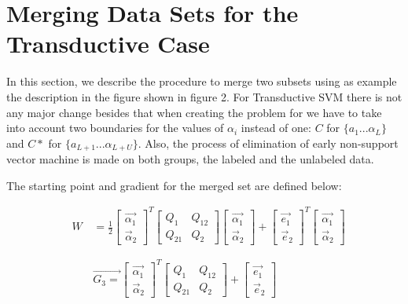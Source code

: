 \section{Merging Data Sets for the Transductive Case}

In this section, we describe the procedure to merge two subsets
using as example the description in the figure shown in figure 2.
For Transductive SVM there is not any major change besides that
when creating the problem for  we have
to take into account two boundaries for the values of $\alpha_{i}$
instead of one: $C$ for $\{a_{1}...\alpha_{L}\}$and $C*$ for $\{a_{L+1}...\alpha_{L+U}\}$.
Also, the process of elimination of early non-support vector machine
 is made on both groups, the labeled and the unlabeled data. 

The starting point and gradient for the merged set are defined below:

\begin{eqnarray}
 & W\, & =\frac{1}{2}\left[\begin{array}{c}
\vec{\alpha_{1}}\\
\vec{\alpha}_{2}\end{array}\right]^{T}\left[\begin{array}{cc}
Q_{1} & Q_{12}\\
Q_{21} & Q_{2}\end{array}\right]\left[\begin{array}{c}
\vec{\alpha_{1}}\\
\vec{\alpha}_{2}\end{array}\right]+\left[\begin{array}{c}
\vec{e_{1}}\\
\vec{e}_{2}\end{array}\right]^{T}\left[\begin{array}{c}
\vec{\alpha_{1}}\\
\vec{\alpha}_{2}\end{array}\right]\nonumber \\
\label{eq:mergin-subsets}\\\nonumber \\ &  & \vec{G_{3}=}\left[\begin{array}{c}
\vec{\alpha_{1}}\\
\vec{\alpha}_{2}\end{array}\right]^{T}\left[\begin{array}{cc}
Q_{1} & Q_{12}\\
Q_{21} & Q_{2}\end{array}\right]+\left[\begin{array}{c}
\vec{e_{1}}\\
\vec{e}_{2}\end{array}\right]\nonumber \end{eqnarray}

